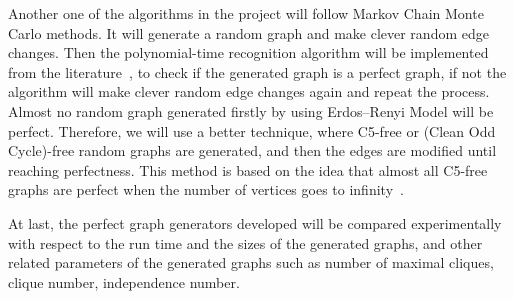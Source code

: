 \documentclass[12pt, oneside, a4paper]{article}
\begin{document}
Another one of the algorithms in the project will follow Markov Chain Monte Carlo methods. It will generate a random graph and make clever random edge changes. Then the polynomial-time recognition algorithm will be implemented from the literature~\cite{tinaz}, to check if the generated graph is a perfect graph, if not the algorithm will make clever random edge changes again and repeat the process. Almost no random graph generated firstly by using Erdos--Renyi Model will be perfect. Therefore, we will use a better technique, where C5-free or (Clean Odd Cycle)-free random graphs are generated, and then the edges are modified until reaching perfectness. This method is based on the idea that almost all C5-free graphs are perfect when the number of vertices goes to infinity~\cite{promel}.
 
At last, the perfect graph generators developed will be compared experimentally with respect to the run time and the sizes of the generated graphs, and other related parameters of the generated graphs such as number of maximal cliques, clique number, independence number.

\newpage
\end{document}

